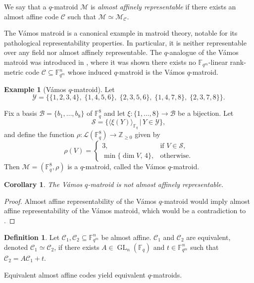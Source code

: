 \documentclass[a4paper,11pt,reqno]{article}
\newcommand{\F}{\mathbb{F}}
\newcommand{\M}{\mathcal{M}}
\newcommand{\C}{\mathcal{C}}
\newcommand{\GL}{\operatorname{GL}}
\theoremstyle{plain} \numberwithin{equation}{section}
\newtheorem{corollary}[theorem]{Corollary}
\theoremstyle{definition}
\newtheorem{definition}[theorem]{Definition}
\newtheorem{example}[theorem]{Example}
\begin{document}
We say that a $q$-matroid $\M$ is \emph{almost affinely representable} if there exists an almost affine code $\C$ such that $\M\simeq \M_\C$.

The Vámos matroid is a canonical example in matroid theory, notable for its pathological representability properties. In particular, it is neither representable over any field nor almost affinely representable. The $q$-analogue of the Vámos matroid was introduced in \cite{DBLP:journals/corr/abs-2104-06570}, where it was shown there exists no $\F_{q^m}$-linear rank-metric code $\C\subseteq \F_{q^m}^n$ whose induced $q$-matroid is the Vámos $q$-matroid.

\begin{example}[Vámos $q$-matroid] Let $$
\mathcal{Y} = \big\{ 
\{1,2,3,4\},\;
\{1,4,5,6\},\;
\{2,3,5,6\},\;
\{1,4,7,8\},\;
\{2,3,7,8\}
\big\}.
$$

Fix a basis $\mathcal{B} = \{b_1,\ldots,b_8\}$ of $\F_q^8$ and let $\xi \colon \{1,\ldots,8\} \rightarrow \mathcal{B}$ be a bijection. Let $$\mathcal{S} = \big\{ \langle \xi(Y) \rangle_{\mathbb{F}_q} \,\big|\, Y \in \mathcal{Y} \big\},$$
and define the function $\rho \colon \mathcal{L}(\mathbb{F}_q^8) \to \mathbb{Z}_{\geq 0}$ given by
$$
\rho(V) =
\begin{cases}
3, & \text{if } V \in \mathcal{S},\\[4pt]
\min\{\dim V,\,4\}, & \text{otherwise.}
\end{cases}
$$
Then $\M = (\F_q^8,\rho)$ is a $q$-matroid, called the Vámos $q$-matroid.
\end{example}

\begin{corollary}
The Vámos $q$-matroid is not almost affinely representable.
\end{corollary}
\begin{proof}
Almost affine representability of the Vámos $q$-matroid would imply almost affine representability of the Vámos matroid, which would be a contradiction to \cite[Proposition 9]{AlmostAffineCodes}.
\end{proof}



\begin{definition}
Let $\C_1,\C_2\subseteq \F_{q^m}^n$ be almost affine. $\C_1$ and $\C_2$ are equivalent, denoted $\C_1\simeq \C_2$, if there exists $A\in \GL_n(\F_q)$ and $t\in \F_{q^m}^n$ such that $\C_2 = A\C_1 + t$.
\end{definition}

Equivalent almost affine codes yield equivalent $q$-matroids.
\end{document}
